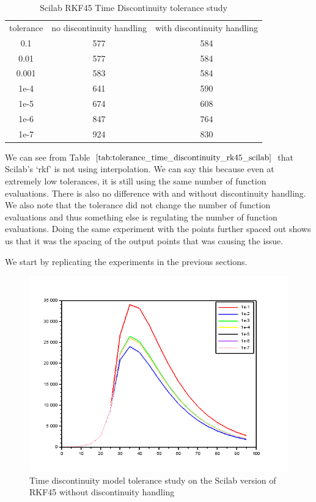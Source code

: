 \begin{table}[h]
\caption {Scilab RKF45 Time Discontinuity tolerance study} 
\label{tab:tolerance_time_discontinuity_rk45_scilab} 
\begin{center}
\begin{tabular}{ c c c }
tolerance & no discontinuity handling & with discontinuity handling\\ 
0.1 & 577 & 584 \\
0.01 & 577 & 584 \\
0.001 & 583 & 584 \\
1e-4 & 641 & 590 \\
1e-5 & 674 & 608 \\
1e-6 & 847 & 764 \\
1e-7 & 924 & 830 \\
\end{tabular}
\end{center}
\end{table}
We can see from Table $\ref{tab:tolerance_time_discontinuity_rk45_scilab}$ that Scilab's `rkf' is not using interpolation. We can say this because even at extremely low tolerances, it is still using the same number of function evaluations. There is also no difference with and without discontinuity handling. We also note that the tolerance did not change the number of function evaluations and thus something else is regulating the number of function evaluations. Doing the same experiment with the points further spaced out shows us that it was the spacing of the output points that was causing the issue.

We start by replicating the experiments in the previous sections.
\begin{figure}[h]
\centering
\includegraphics[width=0.7\linewidth]{./figures/tolerance_time_rkf_further_no_event_sci}
\caption{Time discontinuity model tolerance study on the Scilab version of RKF45 without discontinuity handling}
\label{fig:tolerance_time_rkf_further_no_event_sci}
\end{figure}

